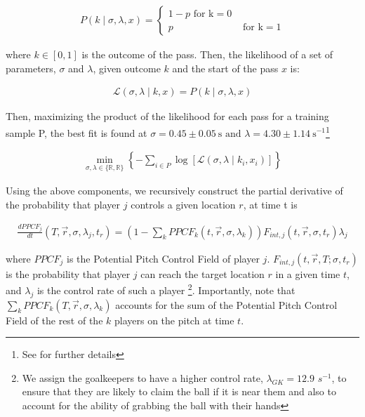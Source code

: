 \documentclass[
  twoside,nohyper]{book}
\begin{document}
\begin{align}
P(k \mid \sigma, \lambda, x)=\left\{\begin{array}{lr}
1-p \text { for } \mathrm{k}=0 \\
p & \text { for } \mathrm{k}=1
\end{array}\right.
\end{align}

where \(k \in [0,1]\) is the outcome of the pass. Then, the likelihood of a set of\\
parameters, \(\sigma\) and \(\lambda\), given outcome \(k\) and the start of the pass \(x\) is:

\begin{align}
\mathcal{L}(\sigma, \lambda \mid k, x)=P(k \mid \sigma, \lambda, x)
\end{align}

Then, maximizing the product of the likelihood for each pass for a training sample P, the best fit is found at \(\sigma=0.45 \pm 0.05 \mathrm{~s} \text { and } \lambda=4.30 \pm 1.14 \mathrm{~s}^{-1}\)\footnote{See \citep{SpearmanFit} for further details}

\begin{align}
\min _{\sigma, \lambda \in\{\mathbb{R}, \mathbb{R}\}}\left\{-\sum_{i \in P} \log \left[\mathcal{L}\left(\sigma, \lambda \mid k_i, x_i\right)\right]\right\}
\end{align}

Using the above components, we recursively construct the partial derivative of the probability that player \(j\) controls a given location \(r\), at time t is

\begin{align}
\frac{d P P C F_j}{d t}\left(T, \vec{r} , \sigma, \lambda_j, t_r\right)=\left(1-\sum_k P P C F_k\left(t, \vec{r} , \sigma, \lambda_k\right)\right) F_{int,j}(t, \vec{r}  , \sigma, t_r) \lambda_j
\label{PC_eq}
\end{align}

where \(PPCF_j\) is the Potential Pitch Control Field of player \(j\). \(F_{int,j}(t, \vec{r}, T ; \sigma, t_r)\) is the probability that player \(j\) can reach the target location \(r\) in a given time \(t\), and \(\lambda_j\) is the control rate of such a player \footnote{We assign the goalkeepers to have a higher control rate, \(\lambda_{GK} = 12.9\) \(s^{-1}\), to ensure that they are likely to claim the ball if it is near them and also to account for the ability of grabbing the ball with their hands}. Importantly, note that \(\sum_k P P C F_k\left(T, \vec{r} , \sigma, \lambda_k\right)\) accounts for the sum of the Potential Pitch Control Field of the rest of the \(k\) players on the pitch at time \(t\).
\end{document}
